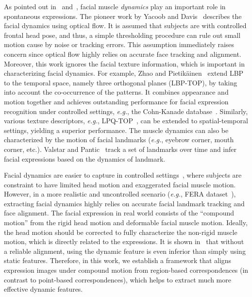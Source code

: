 \documentclass[journal]{IEEEtran}
\begin{document}
As pointed out in~\cite{Ekman2005} and~\cite{Ambadar05}, facial muscle \textit{dynamics} play an important role in spontaneous expressions. The pioneer work by Yacoob and Davis~\cite{Yacoob_PAMI96} describes the facial dynamics using optical flow. It is assumed that subjects are with controlled frontal head pose, and thus, a simple thresholding procedure can rule out small motion cause by noise or tracking errors. This assumption immediately raises concern since optical flow highly relies on accurate face tracking and alignment. Moreover, this work ignores the facial texture information, which is important in characterizing facial dynamics. For example, Zhao and Pietik\"ainen~\cite{Zhao_PAMI07} extend LBP to the temporal space, namely three orthogonal planes (LBP-TOP), by taking into account the co-occurrence of the patterns. It combines appearance and motion together and achieves outstanding performance for facial expression recognition under controlled settings, \textit{e.g.}, the Cohn-Kanade database~\cite{CKplus}. Similarly, various texture descriptors, \textit{e.g.}, LPQ-TOP~\cite{LPQ-TOP}, can be extended to spatial-temporal settings, yielding a superior performance. The muscle dynamics can also be characterized by the motion of facial landmarks (\textit{e.g.}, eyebrow corner, mouth corner, etc.). Valstar and Pantic~\cite{Valstar_SMCB12} track a set of landmarks over time and infer facial expressions based on the dynamics of landmark. 




Facial dynamics are easier to capture in controlled settings~\cite{CKplus}, where subjects are constraint to have limited head motion and exaggerated facial muscle motion. However, in a more realistic and uncontrolled scenario (\textit{e.g.}, FERA dataset~\cite{Valstar_FERA11}), extracting facial dynamics highly relies on accurate facial landmark tracking and face alignment. The facial expression in real world consists of the ``compound motion'' from the rigid head motion and deformable facial muscle motion. Ideally, the head motion should be corrected to fully characterize the non-rigid muscle motion, which is directly related to the expressions. It is shown in~\cite{Valstar12,Yang_SMCB12} that without a reliable alignment, using the dynamic feature is even inferior than simply using static features. Therefore, in this work, we establish a framework that aligns expression images under compound motion from region-based correspondences (in contrast to point-based correspondences), which helps to extract much more effective dynamic features. 
\end{document}
